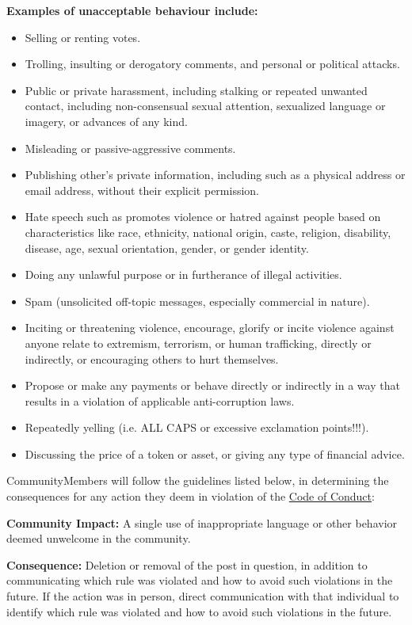 \textbf{Examples of unacceptable behaviour include:}
\begin{itemize}
	\item Selling or renting votes.
	\item Trolling, insulting or derogatory comments, and personal or political attacks.
	\item Public or private harassment, including stalking or repeated unwanted contact, including non-consensual sexual attention, sexualized language or imagery, or advances of any kind.
	\item Misleading or passive-aggressive comments.
	\item Publishing other's private information, including such as a physical address or email address, without their explicit permission.
	\item Hate speech such as promotes violence or hatred against people based on characteristics like race, ethnicity, national origin, caste, religion, disability, disease, age, sexual orientation, gender, or gender identity.
	\item Doing any unlawful purpose or in furtherance of illegal activities.
	\item Spam (unsolicited off-topic messages, especially commercial in nature).
	\item Inciting or threatening violence, encourage, glorify or incite violence against anyone relate to extremism, terrorism, or human trafficking, directly or indirectly, or encouraging others to hurt themselves.
	\item Propose or make any payments or behave directly or indirectly in a way that results in a violation of applicable anti-corruption laws.
	\item Repeatedly yelling (i.e. ALL CAPS or excessive exclamation points!!!).
	\item Discussing the price of a token or asset, or giving any type of financial advice.
\end{itemize}


\glspl{CommunityMember} will follow the guidelines listed below, in determining the consequences for any action they deem in violation of the \hyperref[sec:CodeOfConduct]{Code of Conduct}:

\textbf{Community Impact:} A single use of inappropriate language or other behavior deemed unwelcome in the community.

\textbf{Consequence:} Deletion or removal of the post in question, in addition to communicating which rule was violated and how to avoid such violations in the future. 
If the action was in person, direct communication with that individual to identify which rule was violated and how to avoid such violations in the future.

